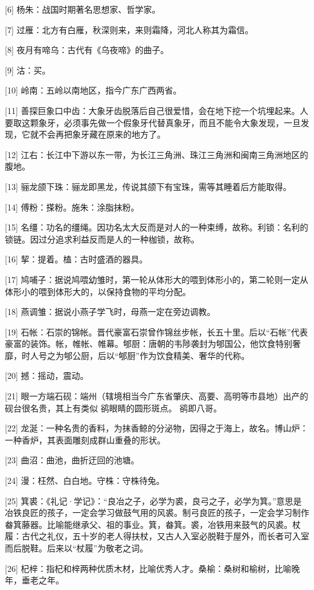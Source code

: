 \documentclass[12pt,UTF8]{ctexbook}
\begin{document}
[6] 杨朱：战国时期著名思想家、哲学家。

[7] 过雁：北方有白雁，秋深则来，来则霜降，河北人称其为霜信。

[8] 夜月有啼乌：古代有《乌夜啼》的曲子。

[9] 沽：买。

[10] 岭南：五岭以南地区，指今广东广西两省。

[11] 善探巨象口中齿：大象牙齿脱落后自己很爱惜，会在地下挖一个坑埋起来。人要取这颗象牙，必须事先做一个假象牙代替真象牙，而且不能令大象发现，一旦发现，它就不会再把象牙藏在原来的地方了。

[12] 江右：长江中下游以东一带，为长江三角洲、珠江三角洲和闽南三角洲地区的腹地。

[13] 骊龙颌下珠：骊龙即黑龙，传说其颌下有宝珠，需等其睡着后方能取得。

[14] 傅粉：搽粉。施朱：涂脂抹粉。

[15] 名缰：功名的缰绳。因功名太大反而是对人的一种束缚，故称。利锁：名利的锁链。因过分追求利益反而是人的一种枷锁，故称。

[16] 挈：提着。榼：古时盛酒的器具。

[17] 鸠哺子：据说鸠喂幼雏时，第一轮从体形大的喂到体形小的，第二轮则一定从体形小的喂到体形大的，以保持食物的平均分配。

[18] 燕调雏：据说小燕子学飞时，母燕一定在旁边调教。

[19] 石帐：石崇的锦帐。晋代豪富石崇曾作锦丝步帐，长五十里。后以“石帐”代表豪富的装饰。帐，帷帐、帷幕。郇厨：唐朝的韦陟袭封为郇国公，他饮食特别奢靡，时人号之为郇公厨，后以“郇厨”作为饮食精美、奢华的代称。

[20] 撼：摇动，震动。

[21] 眼一方端石砚：端州（辖境相当今广东省肇庆、高要、高明等市县地）出产的砚台很名贵，其上有类似 鹆眼睛的圆形斑点。 鹆即八哥。

[22] 龙涎：一种名贵的香料，为抹香鲸的分泌物，因得之于海上，故名。博山炉：一种香炉，其表面雕刻成群山重叠的形状。

[23] 曲沼：曲池，曲折迂回的池塘。

[24] 漫：枉然、白白地。守株：守株待兔。

[25] 箕裘：《礼记·学记》：“良冶之子，必学为裘，良弓之子，必学为箕。”意思是冶铁良匠的孩子，一定会学习做鼓气用的风裘。制弓良匠的孩子，一定会学习制作畚箕藤器。比喻能继承父、祖的事业。箕，畚箕。裘，冶铁用来鼓气的风裘。杖履：古代之礼仪，五十岁的老人得扶杖，又古人入室必脱鞋于屋外，而长者可入室而后脱鞋。后来以“杖履”为敬老之词。

[26] 杞梓：指杞和梓两种优质木材，比喻优秀人才。桑榆：桑树和榆树，比喻晚年，垂老之年。
\end{document}
